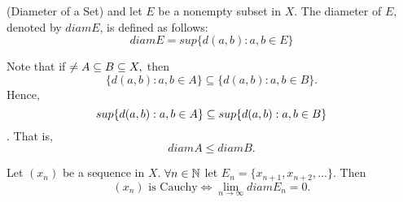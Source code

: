 \begin{definition} (Diameter of a Set)
    \routineMS and let $E$ be a nonempty subset in $X$. The diameter of $E$, denoted by $diamE$, is defined as follows:
    $$diamE = sup\{d(a,b) : a,b \in E\}$$
\end{definition}

\begin{remark}
    Note that if $\empty \not = A \subseteq B \subseteq X,$ then
    $$\{d(a,b) : a,b \in A\} \subseteq \{d(a,b) : a,b \in B \}.$$
    Hence,
    $$ sup\{d(a,b): a,b \in A \} \subseteq sup\{d(a,b): a,b \in B \}$$.
    That is,
    $$diamA \leq diamB.$$
\end{remark}

\begin{observation}
    Let $(x_n)$ be a sequence in $X$. $\forall n \in \mathbb{N}$ let $E_n = \{x_{n+1}, x_{n+2},...\}.$ Then
    $$(x_n) \text{ is Cauchy} \iff \lim_{n \to \infty}diamE_n = 0.$$
\end{observation}

